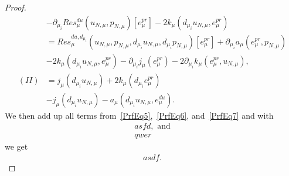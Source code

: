 \begin{proof}
\begin{align}
        &- \partial_{\mu_i} Res_\mu^{du}(u_{N, \mu}, p_{N, \mu})[e_\mu^{pr}] - 2 k_\mu(d_{\mu_i} u_{N, \mu}, e_\mu^{pr}) \nonumber\\
        &= Res_\mu^{du, d_{\mu_i}}(u_{N, \mu}, p_{N, \mu}, d_{\mu_i} u_{N, \mu}, d_{\mu_i} p_{N, \mu})[e_\mu^{pr}] + \partial_{\mu_i} a_\mu(e_\mu^{pr}, p_{N, \mu}) \nonumber\\
        &- 2 k_\mu(d_{\mu_i} u_{N, \mu}, e_\mu^{pr}) - \partial_{\mu_i} j_\mu(e_\mu^{pr}) - 2 \partial_{\mu_i} k_\mu(e_\mu^{pr}, u_{N, \mu}), \nonumber\\
        (II) &= j_\mu(d_{\mu_i} u_{N, \mu}) + 2 k_\mu(d_{\mu_i} e_\mu^{pr}) \label{PrfEq7}\\
        &- j_\mu(d_{\mu_i} u_{N, \mu}) - a_\mu(d_{\mu_i} u_{N, \mu}, e_\mu^{du}). \nonumber
    \end{align}
    We then add up all terms from~\eqref{PrfEq5},~\eqref{PrfEq6}, and~\eqref{PrfEq7} and with
    \begin{align*}
        asfd, \text{ and} \\
        qwer
    \end{align*}
    we get
    \begin{align}
        asdf.
    \end{align}
\end{proof}